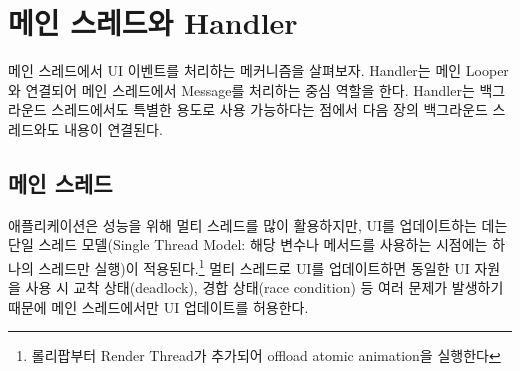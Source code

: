 \chapter{메인 스레드와 Handler}
메인 스레드에서 UI 이벤트를 처리하는 메커니즘을 살펴보자. Handler는 메인 Looper와 연결되어 메인 스레드에서 Message를 처리하는 중심 역할을 한다. 
Handler는 백그라운드 스레드에서도 특별한 용도로 사용 가능하다는 점에서 다음 장의 백그라운드 스레드와도 내용이 연결된다.

\section{메인 스레드}
애플리케이션은 성능을 위해 멀티 스레드를 많이 활용하지만, UI를 업데이트하는 데는 단일 스레드 모델(Single Thread Model: 해당 변수나 메서드를 사용하는 시점에는 하나의 스레드만 실행)이 적용된다.\footnote{롤리팝부터 Render Thread가 추가되어 offload atomic animation을 실행한다}
멀티 스레드로 UI를 업데이트하면 동일한 UI 자원을 사용 시 교착 상태(deadlock), 경합 상태(race condition) 등 여러 문제가 발생하기 때문에 메인 스레드에서만 UI 업데이트를 허용한다.\\

